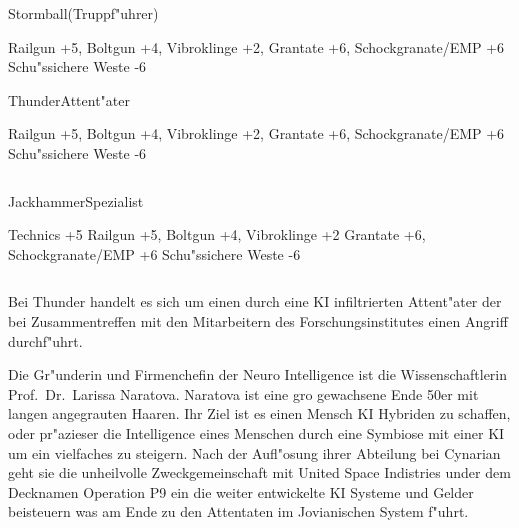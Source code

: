 \begin{column}[l]{0.45}
    \begin{nscsheet}[h]{Stormball\newline{}(Truppf"uhrer)}
        \nscstats[ATT=7,AGG=7,EMP=2,KNO=3,HP=12]
        \nscruler
        \begin{nscinventory}
            \nscitem[Waffen] Railgun +5, Boltgun +4, Vibroklinge +2, 
            \nscitem[Granaten] Grantate +6, Schockgranate/EMP +6
            \nscitem[R"ustung] Schu"ssichere Weste -6           
        \end{nscinventory}
    \end{nscsheet}

    \begin{nscsheet}[h]{Thunder\newline{}Attent"ater}
        \nscstats[ATT=7,AGG=7,EMP=2,KNO=4,HP=12]
        \nscruler
        \begin{nscinventory}
            \nscitem[Waffen] Railgun +5, Boltgun +4, Vibroklinge +2, 
            \nscitem[Granaten] Grantate +6, Schockgranate/EMP +6
            \nscitem[R"ustung] Schu"ssichere Weste -6           
        \end{nscinventory}
    \end{nscsheet}
\end{column}
\begin{column}[r]{0.45}
    \begin{nscsheet}[h]{Jackhammer\newline{}Spezialist}
        \nscstats[ATT=2,AGG=2,EMP=3,KNO=5,HP=10]
        \nscruler
        \begin{nscinventory}
            \nscitem[F"ahigkeit] Technics +5
            \nscitem[Waffen] Railgun +5, Boltgun +4, Vibroklinge +2
            \nscitem[Granaten] Grantate +6, Schockgranate/EMP +6
            \nscitem[R"ustung] Schu"ssichere Weste -6
        \end{nscinventory}
    \end{nscsheet}
\end{column}

\medskip
Bei Thunder handelt es sich um einen durch eine KI infiltrierten Attent"ater der bei Zusammentreffen mit den 
Mitarbeitern des Forschungsinstitutes einen Angriff durchf"uhrt.

\renewcommand{\ml}{\pinyin{Mailin2}}


Die Gr"underin und Firmenchefin der Neuro Intelligence ist die Wissenschaftlerin Prof.~Dr.~Larissa Naratova. Naratova ist eine gro\3 gewachsene Ende 50er mit langen angegrauten Haaren. Ihr Ziel ist es einen Mensch KI Hybriden zu schaffen, oder pr"azieser die Intelligence eines Menschen durch eine Symbiose mit einer KI um ein vielfaches zu steigern. Nach der Aufl"osung ihrer Abteilung bei Cynarian geht sie die unheilvolle Zweckgemeinschaft mit United Space Indistries under dem Decknamen Operation P9 ein die weiter entwickelte KI Systeme und Gelder beisteuern was am Ende zu den Attentaten im Jovianischen System f"uhrt.

